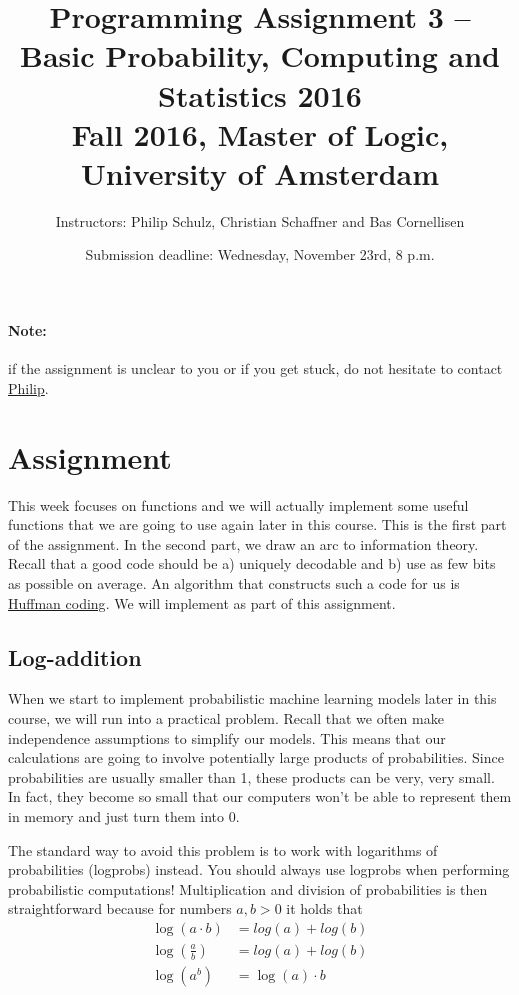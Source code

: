 \documentclass[11pt, leqno, a4paper]{article}
\title{Programming Assignment 3 -- Basic Probability, Computing and Statistics 2016 \\[2mm]
\large{Fall 2016, Master of Logic, University of Amsterdam}}
\author{Instructors: Philip Schulz, Christian Schaffner and Bas Cornellisen}
\date{Submission deadline: Wednesday, November 23rd, 8 p.m.}
\begin{document}
\maketitle

\paragraph{Note:} if the assignment is unclear to you or if you get stuck, do not hesitate to contact \href{mailto:P.Schulz@uva.nl}{Philip}.

\section{Assignment}

This week focuses on functions and we will actually implement some useful functions that we are going to use again later in this course. This is 
the first part of the assignment. In the second part, we draw an arc to information theory. Recall that a good code should be a) uniquely decodable
and b) use as few bits as possible on average. An algorithm that constructs such a code for us is \href{https://en.wikipedia.org/wiki/Huffman_coding}{Huffman coding}.
We will implement as part of this assignment.

\subsection{Log-addition}

When we start to implement probabilistic machine learning models later in this course, we will run into a practical problem. Recall that we often make 
independence assumptions to simplify our models. This means that our calculations are going to involve potentially large products of probabilities. Since
probabilities are usually smaller than 1, these products can be very, very small. In fact, they become so small that our computers won't be able to 
represent them in memory and just turn them into 0.

The standard way to avoid this problem is to work with logarithms of probabilities (logprobs) instead. You should always use logprobs when performing
probabilistic computations! Multiplication and division of probabilities is then straightforward because for numbers $ a,b > 0 $ it holds that
\begin{align*}
\log(a \cdot b) &= log(a) + log(b) \\
\log\left( \frac{a}{b} \right) &= log(a) + log(b) \\
\log\left( a^{b} \right) &= \log(a) \cdot b
\end{align*}
\end{document}
